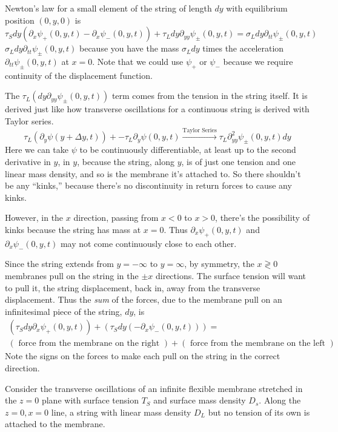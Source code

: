 \documentclass[twoside,10pt]{amsart}
\newcommand{\problemhead}[1]
  {\smallskip
   \noindent{\large\bf Problem #1.}
   \smallskip}
\begin{document}
Newton's law for a small element of the string of length $dy$ with equilibrium position $(0,y,0)$ is 
\[
\tau_S dy \left( \partial_x \psi_+(0,y,t) - \partial_x \psi_-(0,y,t) \right) + \tau_L dy \partial_{yy} \psi_{\pm}(0,y,t) = \sigma_L dy \partial_{tt} \psi_{\pm}(0,y,t)
\]
$\sigma_L dy \partial_{tt} \psi_{\pm}(0,y,t)$ because you have the mass $\sigma_L dy$ times the acceleration $\partial_{tt} \psi_{\pm}(0,y,t)$ at $x=0$.  Note that we could use $\psi_{+}$ or $\psi_-$ because we require continuity of the displacement function.  

The $\tau_L( dy \partial_{yy} \psi_{\pm}(0,y,t))$ term comes from the tension in the string itself.  It is derived just like how transverse oscillations for a continuous string is derived with Taylor series.
\[
\tau_L(\partial_y \psi(y+\Delta y,t) ) + -\tau_L \partial_y \psi(0,y,t) \xrightarrow{\text{Taylor Series}} \tau_L \partial^2_{yy} \psi_{\pm}(0,y,t) dy
\]
Here we can take $\psi$ to be continuously differentiable, at least up to the second derivative in $y$, in $y$, because the string, along $y$, is of just one tension and one linear mass density, and so is the membrane it's attached to.  So there shouldn't be any ``kinks,'' because there's no discontinuity in return forces to cause any kinks.  

However, in the $x$ direction, passing from $x<0$ to $x>0$, there's the possibility of kinks because the string has mass at $x=0$.  Thus $\partial_x \psi_+(0,y,t)$ and $\partial_x \psi_-(0,y,t)$ may not come continuously close to each other.  

Since the string extends from $y=-\infty$ to $y=\infty$, by symmetry, the $x\gtrless 0$ membranes pull on the string in the $\pm x$ directions.  The surface tension will want to pull it, the string displacement, back in, away from the transverse displacement.  Thus the \emph{sum} of the forces, due to the membrane pull on an infinitesimal piece of the string, $dy$, is 
\begin{multline*}
\left( \tau_S dy \partial_x \psi_+(0,y,t) \right) + \left( \tau_S dy (-\partial_x \psi_-(0,y,t) ) \right) = \\
( \text{ force from the membrane on the right } ) + ( \text{ force from the membrane on the left } )
\end{multline*}
Note the signs on the forces to make each pull on the string in the correct direction.  

\problemhead{11.5}
Consider the transverse oscillations of an infinite flexible membrane stretched in the $z=0$ plane with surface tension $T_S$ and surface mass density $D_s$.  Along the $z=0,x=0$ line, a string with linear mass density $D_L$ but no tension of its own is attached to the membrane.  
\end{document}
